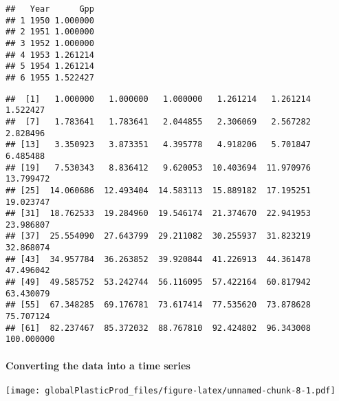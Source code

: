 \documentclass[
]{article}
\newenvironment{Shaded}{\begin{snugshade}}{\end{snugshade}}
\newcommand{\DataTypeTok}[1]{\textcolor[rgb]{0.13,0.29,0.53}{#1}}
\newcommand{\DecValTok}[1]{\textcolor[rgb]{0.00,0.00,0.81}{#1}}
\newcommand{\KeywordTok}[1]{\textcolor[rgb]{0.13,0.29,0.53}{\textbf{#1}}}
\newcommand{\NormalTok}[1]{#1}
\newcommand{\OperatorTok}[1]{\textcolor[rgb]{0.81,0.36,0.00}{\textbf{#1}}}
\newcommand{\StringTok}[1]{\textcolor[rgb]{0.31,0.60,0.02}{#1}}
\begin{document}
\begin{verbatim}
##   Year      Gpp
## 1 1950 1.000000
## 2 1951 1.000000
## 3 1952 1.000000
## 4 1953 1.261214
## 5 1954 1.261214
## 6 1955 1.522427
\end{verbatim}

\begin{Shaded}
\end{Shaded}

\begin{verbatim}
##  [1]   1.000000   1.000000   1.000000   1.261214   1.261214   1.522427
##  [7]   1.783641   1.783641   2.044855   2.306069   2.567282   2.828496
## [13]   3.350923   3.873351   4.395778   4.918206   5.701847   6.485488
## [19]   7.530343   8.836412   9.620053  10.403694  11.970976  13.799472
## [25]  14.060686  12.493404  14.583113  15.889182  17.195251  19.023747
## [31]  18.762533  19.284960  19.546174  21.374670  22.941953  23.986807
## [37]  25.554090  27.643799  29.211082  30.255937  31.823219  32.868074
## [43]  34.957784  36.263852  39.920844  41.226913  44.361478  47.496042
## [49]  49.585752  53.242744  56.116095  57.422164  60.817942  63.430079
## [55]  67.348285  69.176781  73.617414  77.535620  73.878628  75.707124
## [61]  82.237467  85.372032  88.767810  92.424802  96.343008 100.000000
\end{verbatim}

\hypertarget{converting-the-data-into-a-time-series}{%
\paragraph{Converting the data into a time
series}\label{converting-the-data-into-a-time-series}}

\begin{Shaded}
\end{Shaded}

\texttt{[image: globalPlasticProd\_files/figure-latex/unnamed-chunk-8-1.pdf]}
\end{document}
